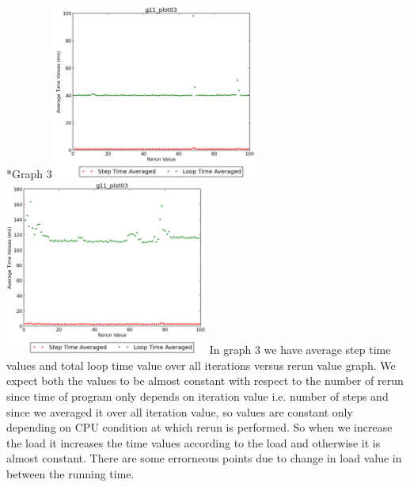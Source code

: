 \documentclass[11pt]{article}
\begin{document}
\begin{subsection}*{Graph 3}
\includegraphics[width=0.5\textwidth,keepaspectratio]{3.eps} \includegraphics[width=0.5\textwidth,keepaspectratio]{load_3.eps}
In graph 3 we have average step time values and total loop time value over all iterations versus rerun value graph.
We expect both the values to be almost constant with respect to the number of rerun since time of program only depends on iteration value i.e. number of steps and since we averaged it over all iteration value, so values are constant only depending on CPU condition at which rerun is performed.
So when we increase the load it increases the time values according to the load and otherwise it is almost constant. There are some errorneous points due to change in load value in between the running time.
\end{subsection}
\end{document}
